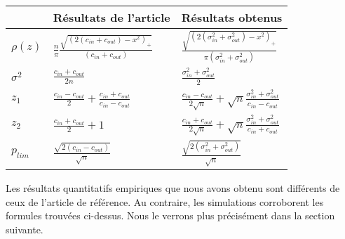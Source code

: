 \renewcommand{\arraystretch}{2}
\begin{table}[h]
	\centering
    \begin{tabular}{|l|l|l|}
    \hline
      &  Résultats de l'article  &  Résultats obtenus \\ \hline
    $\rho (z)$  &  $\frac{n}{\pi}\frac{\sqrt{(2(c_{in} + c_{out}) - x^2)_+}}{(c_{in} + c_{out})}$&  $\frac{\sqrt{(2(\sigma_{in}^2 + \sigma_{out}^2) - x^2)_+}}{\pi(\sigma_{in}^2 + \sigma_{out}^2)}$\\ \hline
    $\sigma^2$ &  $\frac{c_{in} + c_{out}}{2n}$ &  $\frac{\sigma_{in}^2 + \sigma_{out}^2}{2}$ \\ \hline
    $z_1$&  $\frac{c_{in}-c_{out}}{2} + \frac{c_{in}+c_{out}}{c_{in}-c_{out}}$ &  $\frac{c_{in}-c_{out}}{2\sqrt{n}} + \sqrt{n}\frac{\sigma_{in}^2+\sigma_{out}^2}{c_{in}-c_{out}}$\\ \hline
    $z_2$&  $\frac{c_{in}+c_{out}}{2} + 1$ &  $\frac{c_{in}+c_{out}}{2\sqrt{n}} + \sqrt{n}\frac{\sigma_{in}^2+\sigma_{out}^2}{c_{in}+c_{out}}$\\ \hline
    $p_{lim}$&  $\frac{\sqrt{2(c_{in} - c_{out})}}{\sqrt{n}}$ &  $\frac{\sqrt{2(\sigma_{in}^2 + \sigma_{out}^2)}}{\sqrt{n}}$\\ \hline
    \end{tabular}
\end{table}

Les résultats quantitatifs empiriques que nous avons obtenu sont différents de ceux de l'article de référence.
Au contraire, les simulations corroborent les formules trouvées ci-dessus.
Nous le verrons  plus précisément dans la section suivante.   
